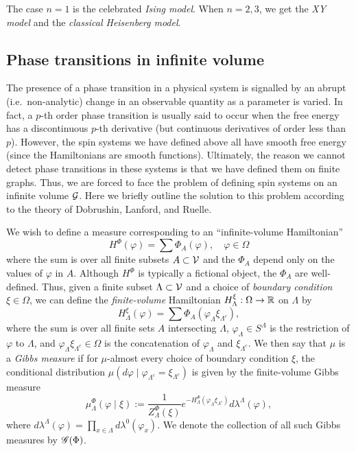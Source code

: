 The case $n = 1$ is the celebrated \emph{Ising model}. When $n = 2, 3$,
we get the \emph{XY model} and the \emph{classical Heisenberg model}.


\subsection{Phase transitions in infinite volume}

The presence of a phase transition in a physical system is signalled by an abrupt
(i.e.\ non-analytic) change in an observable quantity as a parameter is varied. In fact,
a $p$-th order phase transition is usually said to occur when the free energy
has a discontinuous $p$-th derivative (but continuous derivatives of order less than $p$).
However, the spin systems we have defined above all have smooth free energy (since the
Hamiltonians are smooth functions). Ultimately, the reason we cannot detect phase
transitions in these systems is that we have defined them on finite graphs. Thus, we
are forced to face the problem of defining spin systems on an infinite volume $\mathcal{G}$.
Here we briefly outline the solution to this problem according to the theory of Dobrushin,
Lanford, and Ruelle.

We wish to define a measure corresponding to an ``infinite-volume Hamiltonian''
\begin{equation}
H^\Phi(\varphi) = \sum \Phi_A(\varphi),
  \quad
\varphi \in \Omega
\end{equation}
where the sum is over all finite subsets $A \subset \mathcal{V}$ and the $\Phi_A$ depend only on the
values of $\varphi$ in $A$. Although $H^\Phi$ is typically a fictional object, the $\Phi_A$
are well-defined. Thus, given a finite subset $\Lambda\subset\mathcal{V}$ and a choice of
\emph{boundary condition} $\xi\in\Omega$,
we can define the \emph{finite-volume} Hamiltonian $H^\xi_\Lambda : \Omega \rightarrow {\mathbb R}$ on $\Lambda$ by
\begin{equation}
H^\xi_\Lambda(\varphi) = \sum \Phi_A(\varphi_{\Lambda} \xi_{\Lambda^c}),
\end{equation}
where the sum is over all finite sets $A$ intersecting $\Lambda$, $\varphi_{\Lambda} \in S^{\Lambda}$
is the restriction of $\varphi$ to $\Lambda$, and $\varphi_{\Lambda} \xi_{\Lambda^c} \in \Omega$
is the concatenation of $\varphi_{\Lambda}$ and $\xi_{\Lambda^c}$.
We then say that $\mu$ is a \emph{Gibbs measure} if for $\mu$-almost
every choice of boundary condition $\xi$, the conditional distribution
$\mu(d\varphi \mid \varphi_{\Lambda^c} = \xi_{\Lambda^c})$ is given by the finite-volume Gibbs
measure
\begin{equation}
\mu^\Phi_\Lambda(\varphi \mid \xi)
  :=
\frac{1}{Z^\Phi_\Lambda(\xi)}
e^{-H^\Phi_\Lambda(\varphi_\Lambda \xi_{\Lambda^c})}
d\lambda^\Lambda(\varphi),
\end{equation}
where $d\lambda^\Lambda(\varphi) = \prod_{x\in\Lambda} d\lambda^0(\varphi_x)$.
We denote the collection of all such Gibbs measures by $\mathscr{G}(\Phi)$.

